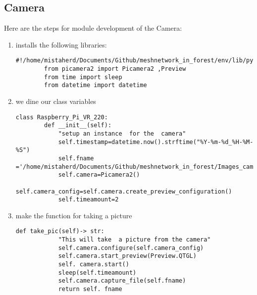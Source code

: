 \subsection{Camera}
Here are the steps for module development of the Camera:
\begin{enumerate}
    \item installs the following libraries:
    \begin{lstlisting}[style=mystyle]
        #!/home/mistaherd/Documents/Github/meshnetwork_in_forest/env/lib/python3.11
        from picamera2 import Picamera2 ,Preview
        from time import sleep
        from datetime import datetime
    \end{lstlisting}
    \item we dine our class variables
    \begin{lstlisting}[style=mystyle]
    class Raspberry_Pi_VR_220:
        def __init__(self):
            "setup an instance  for the  camera"
            self.timestamp=datetime.now().strftime("%Y-%m-%d_%H-%M-%S")
            self.fname ='/home/mistaherd/Documents/Github/meshnetwork_in_forest/Images_camera/{}.png'.format(self.timestamp)
            self.camera=Picamera2()
            self.camera_config=self.camera.create_preview_configuration()
            self.timeamount=2
    \end{lstlisting}
    \item  make the function for taking a  picture
    \begin{lstlisting}[style=mystyle]
        def take_pic(self)-> str:
            "This will take  a picture from the camera"
            self.camera.configure(self.camera_config)
            self.camera.start_preview(Preview.QTGL)
            self. camera.start()
            sleep(self.timeamount)
            self.camera.capture_file(self.fname)
            return self. fname
    \end{lstlisting}
\end{enumerate}
\newpage
